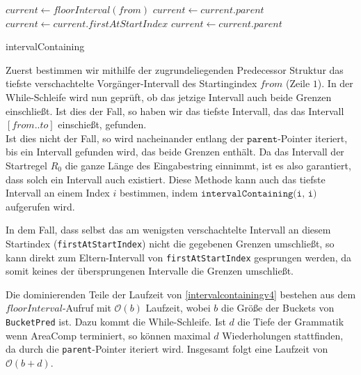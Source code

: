 \begin{algorithm}[t]
    $current \leftarrow floorInterval(from)$
     {
         {
        }
         {
            $current \leftarrow current.parent$\;
        }{
            $current \leftarrow current.firstAtStartIndex$\;
             {
                $current \leftarrow current.parent$ 
            }
        }
    }
    \KwRet{\KwNull}
    \caption{intervalContaining}
    \label{intervalcontainingv4}
\end{algorithm}

Zuerst bestimmen wir mithilfe der zugrundeliegenden Predecessor Struktur das tiefste verschachtelte Vorgänger-Intervall des Startingindex $from$ (Zeile $1$). 
In der While-Schleife wird nun geprüft, ob das jetzige Intervall auch beide Grenzen einschließt. Ist dies der Fall, so haben wir das tiefste Intervall, das das Intervall $[from..to]$ einschießt, gefunden.\\
Ist dies nicht der Fall, so wird nacheinander entlang der $\texttt{parent}$-Pointer iteriert, bis ein Intervall gefunden wird, das beide Grenzen enthält. Da das Intervall der Startregel $R_0$ die ganze Länge des Eingabestring einnimmt, ist es also garantiert, dass solch ein Intervall auch existiert. Diese Methode kann auch das tiefste Intervall an einem Index $i$ bestimmen, indem $\texttt{intervalContaining(i, i)}$ aufgerufen wird.

In dem Fall, dass selbst das am wenigsten verschachtelte Intervall an diesem Startindex (\texttt{firstAtStartIndex}) nicht die gegebenen Grenzen umschließt, so kann direkt zum Eltern-Intervall von \texttt{firstAtStartIndex} gesprungen werden, da somit keines der übersprungenen Intervalle die Grenzen umschließt.

Die dominierenden Teile der Laufzeit von \autoref{intervalcontainingv4} bestehen aus dem $floorInterval$-Aufruf mit $\mathcal{O}(b)$ Laufzeit, wobei $b$ die Größe der Buckets von \texttt{BucketPred} ist. Dazu kommt die While-Schleife. Ist $d$ die Tiefe der Grammatik wenn AreaComp terminiert, so können maximal $d$ Wiederholungen stattfinden, da durch die \texttt{parent}-Pointer iteriert wird. Insgesamt folgt eine Laufzeit von $\mathcal{O}(b + d)$. 

